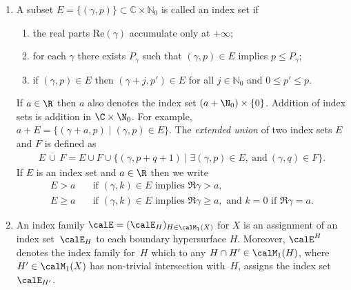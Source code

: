 \skpt
\begin{defn}
\begin{enumerate}
\item
A subset $E =\{(\gamma,p)\} \subset \mathbb{C}\times \mathbb{N}_{0}$
is called an index set if
\begin{enumerate}
\item
the real parts $\text{Re}(\gamma)$ accumulate only at $+\infty$;
\item
for each $\gamma$ there exists $P_{\gamma}$ such that
$(\gamma, p) \in E$ implies $ p \leq P_{\gamma}$;
\item
if $(\gamma, p) \in E$ then $(\gamma + j, p') \in E$
for all $ j \in \mathbb{N}_{0}$ and $0 \leq p' \leq p$.
\end{enumerate}
If $a\in\R$ then $a$ also denotes the index set $(a+\N_0)\times\{0\}$.
Addition of index sets is addition in $\C\times\N_0$.
For example, $a+E=\{(\gamma+a,p)\mid (\gamma,p)\in E\}$.
The \emph{extended union} of two index sets
$E$ and $F$ is defined as
\begin{align}
\label{extended}
E \,\overline{\cup} \,F = E \cup F \cup \{(\gamma, p + q + 1)\mid \exists (\gamma,p) \in E,\
\mbox{and}\ (\gamma,q) \in F \}.
\end{align}
If $E$ is an index set and $a\in\R$ then we write
\begin{align*}
E>a &\quad\text{if } (\gamma,k)\in E \text{ implies } \Re \gamma>a, \\
E\geq a &\quad\text{if } (\gamma,k)\in E \text{ implies } \Re \gamma\geq a, \text{ and $k=0$ if $\Re \gamma=a$}.
\end{align*}
\item
An index family $\calE = (\calE_H)_{H\in\calM_1(X)}$ for $X$ is an assignment of an index set~$\calE_H$ to each boundary hypersurface $H$.
Moreover, $\calE^H$ denotes the index family for~$H$ which to any $H\cap H'\in\calM_1(H)$, where $H'\in\calM_1(X)$ has non-trivial intersection with~$H$,
assigns the index set $\calE_{H'}$.
\end{enumerate}
\end{defn}

